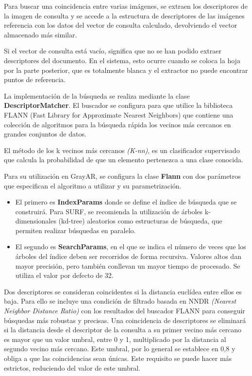 Para buscar una coincidencia entre varias imágenes, se extraen los
descriptores de la imagen de consulta y se accede a la estructura de
descriptores de las imágenes referencia con los
datos del vector de consulta calculado, devolviendo el vector almacenado más
similar.

Si el vector de consulta está vacío, significa que no se han podido
extraer descriptores del documento. En el sistema, esto ocurre
cuando se coloca la hoja por la parte posterior, que es totalmente
blanca y el extractor no puede encontrar puntos de referencia.

La implementación de la búsqueda se realiza mediante la clase
\textbf{DescriptorMatcher}. El buscador se configura para que utilice
la biblioteca FLANN (Fast Library for Approximate Nearest Neighbors)
que contiene una colección de algoritmos para la búsqueda rápida los
vecinos más cercanos en grandes conjuntos de datos.

El método de los k vecinos más cercanos \emph{(K-nn)}, es un clasificador
supervisado que calcula la probabilidad de que un elemento pertenezca
a una clase conocida.

Para su utilización en GrayAR, se configura la clase \textbf{Flann}
con dos parámetros que especifican el algoritmo a utilizar y su parametrización.

\begin{itemize}
\item El primero es \textbf{IndexParams} donde se define el índice de búsqueda
que se construirá. Para SURF, se recomienda la utilización de árboles
k-dimensionales (kd-tree) aleatorios como estructuras de búsqueda, que
permiten realizar búsquedas en paralelo.

\item El segundo es \textbf{SearchParams}, en el que se indica el número de
veces que los árboles del índice deben ser recorridos de forma
recursiva. Valores altos dan mayor precisión, pero también conllevan
un mayor tiempo de procesado. Se utiliza el valor por defecto de 32.
\end{itemize}

Dos descriptores se consideran coincidentes si la distancia euclídea
entre ellos es baja. Para ello se incluye una condición de filtrado
basada en NNDR \emph{(Nearest Neighbor Distance Ratio)} con los resultados
del buscador FLANN para conseguir búsquedas más robustas y
precisas. Una coincidencia de descriptores se eliminará si la
distancia desde el descriptor de la consulta a su primer vecino más
cercano es mayor que un valor umbral, entre 0 y 1, multiplicado por la
distancia al segundo vecino más cercano. Este umbral, por lo general
se establece en 0,8 y obliga a que las coincidencias sean únicas. Este
requisito se puede hacer más estrictos, reduciendo del valor de este
umbral.

